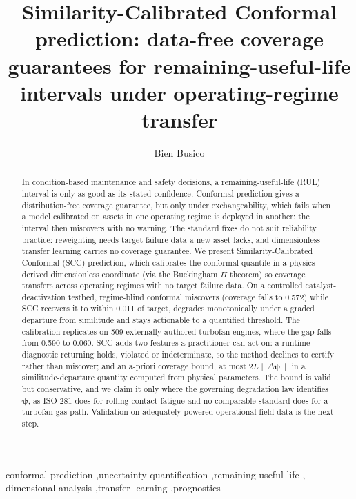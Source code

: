 \documentclass[review,times]{elsarticle}
\theoremstyle{definition}
\theoremstyle{remark}
\begin{document}
\begin{frontmatter}
\title{Similarity-Calibrated Conformal prediction: data-free coverage guarantees for
remaining-useful-life intervals under operating-regime transfer}
\author{Bien Busico}
\address{Map\'ua Malayan College Mindanao, Davao City, Philippines}

\begin{abstract}
In condition-based maintenance and safety decisions, a remaining-useful-life (RUL) interval is only
as good as its stated confidence. Conformal prediction gives a
distribution-free coverage guarantee, but only under exchangeability, which fails when a model
calibrated on assets in one operating regime is deployed in another: the interval then miscovers
with no warning. The standard fixes do not suit reliability practice: reweighting needs target
failure data a new asset lacks, and dimensionless transfer learning carries no coverage guarantee.
We present Similarity-Calibrated Conformal (SCC) prediction, which calibrates the
conformal quantile in a physics-derived dimensionless coordinate (via the Buckingham $\Pi$ theorem)
so coverage transfers across operating regimes with no target failure data. On a controlled
catalyst-deactivation testbed, regime-blind conformal miscovers (coverage falls to 0.572) while SCC
recovers it to within 0.011 of target, degrades monotonically under a graded departure from
similitude and stays actionable to a quantified threshold. The calibration replicates on 509
externally authored turbofan engines, where the gap falls from 0.590 to 0.060.
SCC adds two features a practitioner can act on: a runtime diagnostic returning holds, violated or
indeterminate, so the method declines to certify rather than miscover; and an a-priori coverage
bound, at most $2L\lVert\Delta\boldsymbol\psi\rVert$ in a similitude-departure quantity computed
from physical parameters. The bound is valid but conservative, and we claim it only where the
governing degradation law identifies $\boldsymbol\psi$, as ISO 281 does for rolling-contact fatigue
and no comparable standard does for a turbofan gas path. Validation on adequately powered
operational field data is the next step.
\end{abstract}

\begin{keyword}
conformal prediction \sep uncertainty quantification \sep remaining useful life \sep
dimensional analysis \sep transfer learning \sep prognostics
\end{keyword}
\end{frontmatter}
\end{document}
